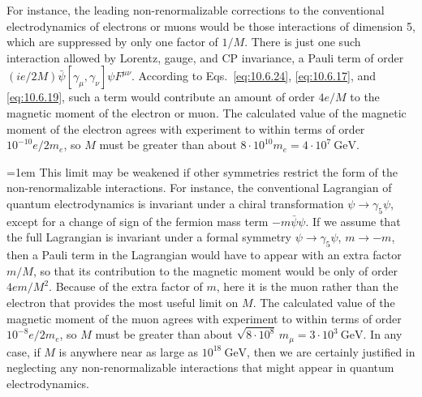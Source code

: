 For instance, the leading non-renormalizable corrections to the conventional
electrodynamics of electrons or muons would be those interactions of dimension
5, which are suppressed by only one factor of $1/M$. There is just one such
interaction allowed by Lorentz, gauge, and CP invariance, a Pauli term of order
$(ie/2M)\bar\psi[\gamma_\mu,\gamma_\nu]\psi F^{\mu\nu}$. According to
Eqs.~\eqref{eq:10.6.24}, \eqref{eq:10.6.17}, and
\eqref{eq:10.6.19}, such a term would contribute an
amount of order $4e/M$ to the magnetic moment of the electron or muon. The
calculated value of the magnetic moment of the electron agrees with experiment
to within terms of order $10^{-10}e/2m_e$, so $M$ must be greater than about
$8\cdot 10^{10}m_e=4\cdot 10^7\ \mathrm{GeV}$.

\begingroup
\emergencystretch=1em
This limit may be weakened if other symmetries restrict the form of the
non-renormalizable interactions. For instance, the conventional Lagrangian of
quantum electrodynamics is invariant under a chiral transformation
$\psi\to\gamma_5\psi$, except for a change of sign of the fermion mass term
$-m\bar\psi\psi$. If we assume that the full Lagrangian is invariant under a
formal symmetry $\psi\to\gamma_5\psi$, $m\to-m$, then a Pauli term in the
Lagrangian would have to appear with an extra factor $m/M$, so that its
contribution to the magnetic moment would be only of order $4em/M^2$. Because
of the extra factor of $m$, here it is the muon rather than the electron that
provides the most useful limit on $M$. The calculated value of the magnetic
moment of the muon agrees with experiment to within terms of order
$10^{-8}e/2m_e$, so $M$ must be greater than about
$\sqrt{8\cdot 10^8}\,m_\mu\allowbreak=3\cdot 10^3\ \mathrm{GeV}$. In any case, if $M$
is anywhere near as large as $10^{18}\ \mathrm{GeV}$, then we are certainly
justified in neglecting any non-renormalizable interactions that might appear
in quantum electrodynamics.\par
\endgroup

